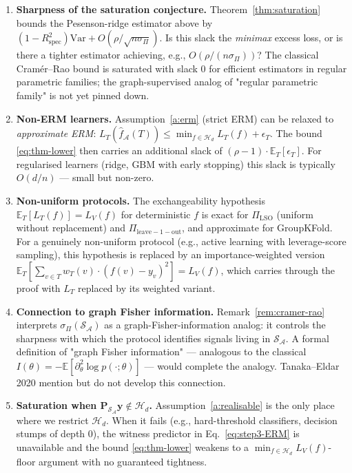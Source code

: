\documentclass[11pt,a4paper]{article}
\theoremstyle{plain}
\theoremstyle{definition}
\theoremstyle{remark}
\newcommand{\by}{\mathbf{y}}
\newcommand{\bP}{\mathbf{P}}
\newcommand{\E}{\mathbb{E}}
\newcommand{\Var}{\mathrm{Var}}
\newcommand{\Rspec}{R^2_{\mathrm{spec}}}
\newcommand{\Scal}{\mathcal{S}}
\newcommand{\Acal}{\mathcal{A}}
\newcommand{\Hcal}{\mathcal{H}}
\begin{document}
\begin{enumerate}
\item \textbf{Sharpness of the saturation conjecture.}
Theorem~\ref{thm:saturation} bounds the Pesenson-ridge estimator above
by $(1-\Rspec)\Var + O(\rho/\sqrt{n\sigma_\Pi})$.  Is this slack the
\emph{minimax} excess loss, or is there a tighter estimator achieving,
e.g., $O(\rho/(n\sigma_\Pi))$?  The classical Cram\'er--Rao bound is
saturated with slack $0$ for efficient estimators in regular parametric
families; the graph-supervised analog of "regular parametric family" is
not yet pinned down.

\item \textbf{Non-ERM learners.}
Assumption~\ref{a:erm} (strict ERM) can be relaxed to \emph{approximate
ERM}: $L_T(\hat f_\Acal(T)) \leq \min_{f \in \Hcal_d} L_T(f) +
\epsilon_T$.  The bound \eqref{eq:thm-lower} then carries an additional
slack of $(\rho - 1) \cdot \E_T[\epsilon_T]$.  For regularised learners
(ridge, GBM with early stopping) this slack is typically $O(d/n)$ —
small but non-zero.

\item \textbf{Non-uniform protocols.}
The exchangeability hypothesis $\E_T[L_T(f)] = L_V(f)$ for deterministic
$f$ is exact for $\Pi_{\mathrm{LSO}}$ (uniform without replacement) and
$\Pi_{\mathrm{leave-1-out}}$, and approximate for GroupKFold.  For a
genuinely non-uniform protocol (e.g., active learning with leverage-score
sampling), this hypothesis is replaced by an importance-weighted version
$\E_T[\sum_{v\in T} w_T(v) \cdot (f(v)-y_v)^2] = L_V(f)$, which carries
through the proof with $L_T$ replaced by its weighted variant.

\item \textbf{Connection to graph Fisher information.}
Remark~\ref{rem:cramer-rao} interprets $\sigma_\Pi(\Scal_\Acal)$ as a
graph-Fisher-information analog: it controls the sharpness with which
the protocol identifies signals living in $\Scal_\Acal$.  A formal
definition of "graph Fisher information" — analogous to the classical
$I(\theta) = -\E[\partial^2_\theta \log p(\cdot;\theta)]$ — would
complete the analogy.  Tanaka--Eldar 2020 mention but do not develop
this connection.

\item \textbf{Saturation when $\bP_{\Scal_\Acal}\by \notin \Hcal_d$.}
Assumption~\ref{a:realisable} is the only place where we restrict
$\Hcal_d$.  When it fails (e.g., hard-threshold classifiers, decision
stumps of depth 0), the witness predictor in
Eq.~\eqref{eq:step3-ERM} is unavailable and the bound \eqref{eq:thm-lower}
weakens to a $\min_{f \in \Hcal_d} L_V(f)$-floor argument with no
guaranteed tightness.
\end{enumerate}
\end{document}
